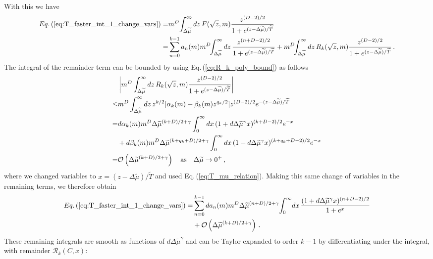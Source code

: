 \documentclass[sn-mathphys,Numbered]{sn-jnl}
\newcommand{\req}[1]{Eq.\,(\ref{#1})}
\begin{document}
With this we have
\begin{align}
\req{eq:T_faster_int_1_change_vars} =&m^{D}\!\int_{\Delta\widetilde{\mu}}^\infty dz\, F(\sqrt{z},m) \frac{z^{(D-2)/2}}{1+e^{(z-\Delta\widetilde{\mu})/\widetilde{T}}} \\
=& \sum_{n=0}^{k-1} a_n(m)m^{D}\!\!\int_{\Delta\widetilde{\mu}}^\infty dz\, \frac{z^{(n+D-2)/2}}{1+e^{(z-\Delta\widetilde{\mu})/\widetilde{T}}}+m^{D}\!\!\int_{\Delta\widetilde{\mu}}^\infty dz\,R_k(\sqrt{z},m)\frac{z^{(D-2)/2}}{1+e^{(z-\Delta\widetilde{\mu})/\widetilde{T}}}\,.\notag
\end{align}
The integral of the remainder term can be bounded by using \req{eq:R_k_poly_bound} as follows
\begin{align}
 &\left|m^{D}\int_{\Delta\widetilde{\mu}}^\infty dz\,R_k(\sqrt{z},m)\frac{z^{(D-2)/2}}{1+e^{(z-\Delta\widetilde{\mu})/\widetilde{T}}}\right|\\
 \leq&m^{D}\int_{\Delta\widetilde{\mu}}^\infty dz\,z^{k/2}[\alpha_k(m)+\beta_k(m)z^{q_k/2}]z^{(D-2)/2}e^{-(z-\Delta\widetilde{\mu})/\widetilde{T}}\notag\\
=&d\alpha_k(m)m^{D}\Delta\widetilde{\mu}^{(k+D)/2+\gamma}\int_{0}^\infty dx\,(1+d\Delta\widetilde{\mu}^{\gamma}x)^{(k+D-2)/2}e^{-x}\notag\\
&+d\beta_k(m)m^{D}\Delta\widetilde{\mu}^{(k+q_k+D)/2+\gamma}\int_{0}^\infty dx\,(1+d\Delta\widetilde{\mu}^{\gamma}x)^{(k+q_k+D-2)/2}e^{-x}\notag\\ 
=&\mathcal{O}\left(\Delta\widetilde{\mu}^{(k+D)/2+\gamma}\right)\quad \text{as}\quad\Delta\widetilde{\mu}\to 0^+\,,\label{eq:T_faster_remainder_bound}
\end{align}
where we changed variables to $x=(z-\Delta\widetilde{\mu})/\widetilde{T}$ and used \req{eq:T_mu_relation}. Making this same change of variables in the remaining terms, we therefore obtain
\begin{align}\label{eq:T_faster_int_1_change_vars_expanded1}
\req{eq:T_faster_int_1_change_vars} =& \sum_{n=0}^{k-1} da_n(m)m^{D}\Delta\widetilde{\mu}^{(n+D)/2+\gamma}\!\int_{0}^\infty\! dx\, \frac{(1+d\Delta\widetilde{\mu}^{\gamma}x)^{(n+D-2)/2}}{1+e^{x}}\\
&+\mathcal{O}\left(\Delta\widetilde{\mu}^{(k+D)/2+\gamma}\right)\,.\notag
\end{align}
These remaining integrals are smooth as functions of $d\Delta\widetilde{\mu}^\gamma$ and can be Taylor expanded to order $k-1$ by differentiating under the integral, with remainder $\mathcal{R}_k(C,x)$:
\end{document}
